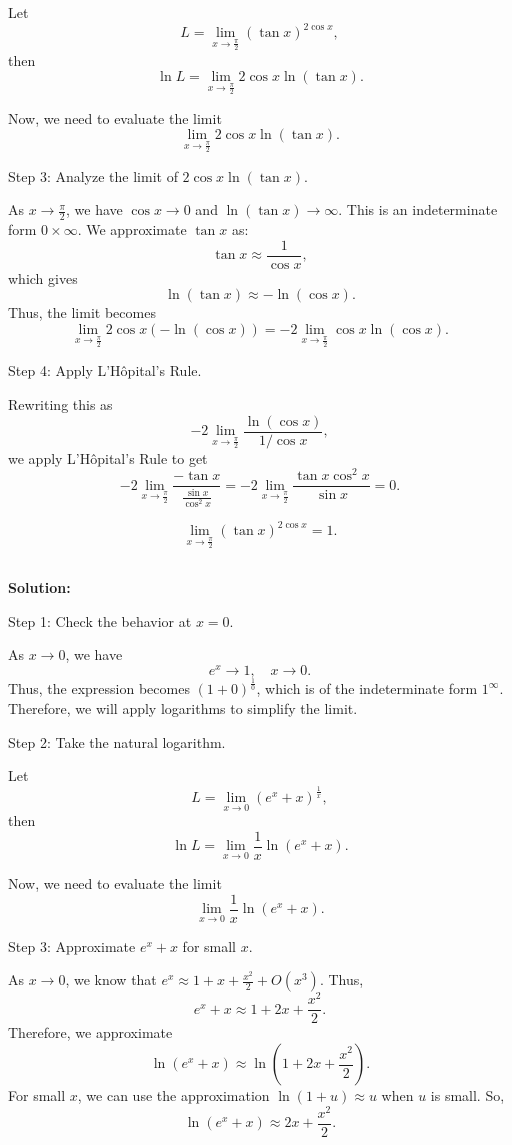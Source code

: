 \documentclass{article}
\begin{document}
Let
\[
L = \lim_{x \to \frac{\pi}{2}} \left(\tan x\right)^{2 \cos x},
\]
then
\[
\ln L = \lim_{x \to \frac{\pi}{2}} 2 \cos x \ln(\tan x).
\]

Now, we need to evaluate the limit
\[
\lim_{x \to \frac{\pi}{2}} 2 \cos x \ln(\tan x).
\]

Step 3: Analyze the limit of \( 2 \cos x \ln(\tan x) \).

As \( x \to \frac{\pi}{2} \), we have \( \cos x \to 0 \) and \( \ln(\tan x) \to \infty \). This is an indeterminate form \( 0 \times \infty \). We approximate \( \tan x \) as:
\[
\tan x \approx \frac{1}{\cos x},
\]
which gives
\[
\ln(\tan x) \approx -\ln(\cos x).
\]
Thus, the limit becomes
\[
\lim_{x \to \frac{\pi}{2}} 2 \cos x (-\ln(\cos x)) = -2 \lim_{x \to \frac{\pi}{2}} \cos x \ln(\cos x).
\]

Step 4: Apply L'Hôpital's Rule.

Rewriting this as
\[
-2 \lim_{x \to \frac{\pi}{2}} \frac{\ln(\cos x)}{1/\cos x},
\]
we apply L'Hôpital's Rule to get
\[
-2 \lim_{x \to \frac{\pi}{2}} \frac{-\tan x}{\frac{\sin x}{\cos^2 x}} = -2 \lim_{x \to \frac{\pi}{2}} \frac{\tan x \cos^2 x}{\sin x} = 0.
\]


\[
\lim_{x \to \frac{\pi}{2}} \left(\tan x\right)^{2 \cos x} = 1.
\]


\subsection{}	
\textbf{Solution:}

Step 1: Check the behavior at \( x = 0 \).

As \( x \to 0 \), we have
\[
e^x \to 1, \quad x \to 0.
\]
Thus, the expression becomes \( (1 + 0)^{\frac{1}{0}} \), which is of the indeterminate form \( 1^\infty \). Therefore, we will apply logarithms to simplify the limit.

Step 2: Take the natural logarithm.

Let
\[
L = \lim_{x \to 0} \left( e^x + x \right)^{\frac{1}{x}},
\]
then
\[
\ln L = \lim_{x \to 0} \frac{1}{x} \ln \left( e^x + x \right).
\]

Now, we need to evaluate the limit
\[
\lim_{x \to 0} \frac{1}{x} \ln \left( e^x + x \right).
\]

Step 3: Approximate \( e^x + x \) for small \( x \).

As \( x \to 0 \), we know that \( e^x \approx 1 + x + \frac{x^2}{2} + O(x^3) \). Thus,
\[
e^x + x \approx 1 + 2x + \frac{x^2}{2}.
\]
Therefore, we approximate
\[
\ln \left( e^x + x \right) \approx \ln \left( 1 + 2x + \frac{x^2}{2} \right).
\]
For small \( x \), we can use the approximation \( \ln(1 + u) \approx u \) when \( u \) is small. So,
\[
\ln \left( e^x + x \right) \approx 2x + \frac{x^2}{2}.
\]
\end{document}
